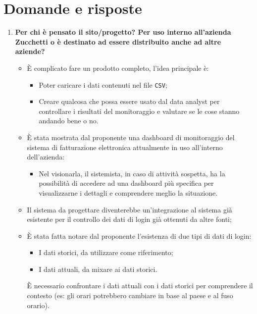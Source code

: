\documentclass[11pt]{article}
\begin{document}
	\newpage

	\section{Domande e risposte}
		\begin{enumerate}
			\item \textbf{Per chi è pensato il sito/progetto? Per uso interno all'azienda Zucchetti o è destinato
			ad essere distribuito anche ad altre aziende?} 
			
			\medskip
			
			\begin{itemize}
				\item È complicato fare un prodotto completo, l'idea principale è:
				\begin{itemize}
					\item Poter caricare i dati contenuti nel file \texttt{CSV};
					\item Creare qualcosa che possa essere usato dal data analyst per controllare i risultati del monitoraggio
					e valutare se le cose stanno andando bene o no.
				\end{itemize}
				\item È stata mostrata dal proponente una dashboard di monitoraggio del sistema di fatturazione elettronica
				attualmente in uso all'interno dell'azienda:
				\begin{itemize}
					\item Nel visionarla, il sistemista, in caso di attività sospetta, ha la possibilità di accedere ad una
					dashboard più specifica	per visualizzarne i dettagli e comprendere meglio la situazione.
				\end{itemize}
				\item Il sistema da progettare diventerebbe un'integrazione al sistema già esistente per il controllo dei dati
				di login già ottenuti da altre fonti;
				\item È stata fatta notare dal proponente l'esistenza di due tipi di dati di login:
				\begin{itemize}
					\item I dati storici, da utilizzare come riferimento;
					\item I dati attuali, da mixare ai dati storici.
				\end{itemize}
				È necessario confrontare i dati attuali con i dati storici per comprendere il contesto (es: gli orari potrebbero
				cambiare in base al paese e al fuso orario).
			\end{itemize}
			

\end{enumerate}
\end{document}
